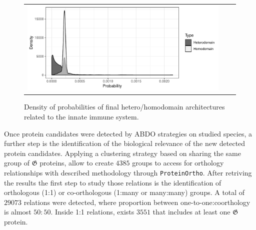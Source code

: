 \documentclass[11pt]{article}
\begin{document}

\begin{figure}
  \begin{tabular}{lcr}
    \begin{minipage}{0.6\textwidth}
    \centering
    \includegraphics[scale=0.6]{figures/distr_bigrams_complete} 
    \end{minipage}
    & \qquad &
    \begin{minipage}{0.35\textwidth}
    \caption{Density of probabilities of final hetero/homodomain architectures related to the
  innate immune system.}\label{fig:probArch}
    \end{minipage}
  \end{tabular}
\end{figure}

Once protein candidates were detected by ABDO strategies on studied species, 
a further step is the identification of the biological relevance of the 
new detected protein candidates. Applying a clustering strategy 
based on sharing the same group of $\boldsymbol{\mathfrak{G}}$ proteins,
allow to create $4385$ groups to access for orthology relationships with 
described methodology through \texttt{ProteinOrtho}. After retriving the
results the first step to study those relations is the identification of 
orthologous (1:1) or co-orthologous (1:many or many:many) groups. 
A total of $29073$ relations were detected, where proportion between
one-to-one:coorthology is almost $50:50$. Inside 1:1 relations, 
exists $3551$ that includes at least one $\boldsymbol{\mathfrak{G}}$ protein.
\end{document}
